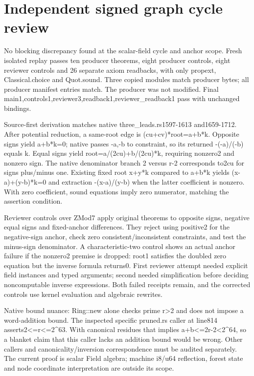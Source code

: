 \documentclass[11pt]{article}
\begin{document}
\sloppy
\section*{Independent signed graph cycle review}
No blocking discrepancy found at the scalar-field cycle and anchor scope. Fresh isolated replay passes ten producer theorems, eight producer controls, eight reviewer controls and 26 separate axiom readbacks, with only propext, Classical.choice and Quot.sound. Three copied modules match producer bytes; all producer manifest entries match. The producer was not modified. Final main1,controls1,reviewer3,readback1,reviewer\_readback1 pass with unchanged bindings.\par\medskip
Source-first derivation matches native three\_leads.rs1597-1613 and1659-1712. After potential reduction, a same-root edge is (cu+cv)*root=a+b*k. Opposite signs yield a+b*k=0; native passes -a,-b to constraint, so its returned -(-a)/(-b) equals k. Equal signs yield root=a/(2cu)+b/(2cu)*k, requiring nonzero2 and nonzero sign. The native denominator branch 2 versus r-2 corresponds to2cu for signs plus/minus one. Existing fixed root x+y*k compared to a+b*k yields (x-a)+(y-b)*k=0 and extraction -(x-a)/(y-b) when the latter coefficient is nonzero. With zero coefficient, sound equations imply zero numerator, matching the assertion condition.\par\medskip
Reviewer controls over ZMod7 apply original theorems to opposite signs, negative equal signs and fixed-anchor differences. They reject using positive2 for the negative-sign anchor, check zero consistent/inconsistent constraints, and test the minus-sign denominator. A characteristic-two control shows an actual anchor failure if the nonzero2 premise is dropped: root1 satisfies the doubled zero equation but the inverse formula returns0. First reviewer attempt needed explicit field instances and typed arguments; second needed simplification before deciding noncomputable inverse expressions. Both failed receipts remain, and the corrected controls use kernel evaluation and algebraic rewrites.\par\medskip
Native bound nuance: Ring::new alone checks prime r>2 and does not impose a word-addition bound. The inspected specific pruned.rs caller at line814 asserts2<=r<=2\textasciicircum{}63. With canonical residues that implies a+b<=2r-2<2\textasciicircum{}64, so a blanket claim that this caller lacks an addition bound would be wrong. Other callers and canonicality/inversion correspondence must be audited separately. The current proof is scalar Field algebra; machine i8/u64 reflection, forest state and node coordinate interpretation are outside its scope.\par\medskip
\end{document}
